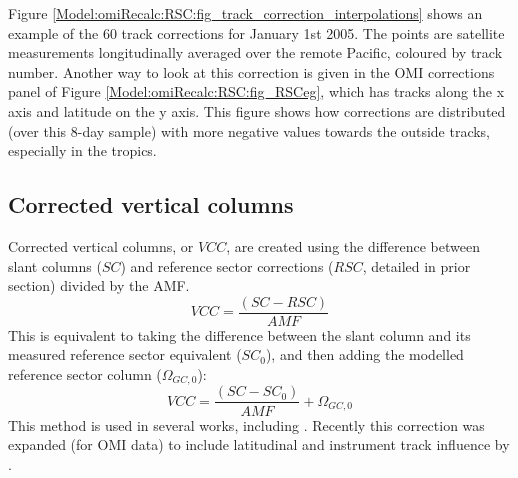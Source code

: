     Figure \ref{Model:omiRecalc:RSC:fig_track_correction_interpolations} shows an example of the 60 track corrections for January 1st 2005.
    The points are satellite measurements longitudinally averaged over the remote Pacific, coloured by track number.
    Another way to look at this correction is given in the OMI corrections panel of Figure \ref{Model:omiRecalc:RSC:fig_RSCeg}, which has tracks along the x axis and latitude on the y axis.
    This figure shows how corrections are distributed (over this 8-day sample) with more negative values towards the outside tracks, especially in the tropics.
    
    
  
  \subsection{Corrected vertical columns}
    \label{Model:omiRecalc:vcc}
    
    Corrected vertical columns, or $VCC$, are created using the difference between slant columns ($SC$) and reference sector corrections ($RSC$, detailed in prior section) divided by the AMF. 
    \begin{equation}
      \label{Model:omiRecalc:vcc:eqn_vcc}
      VCC = \frac{ \left( SC - RSC \right) }{ AMF }
    \end{equation}
    This is equivalent to taking the difference between the slant column and its measured reference sector equivalent ($SC_0$), and then adding the modelled reference sector column ($\Omega_{GC,0}$):
    \begin{equation}
      \label{Model:omiRecalc:vcc:eqn_vcc_equiv}
      VCC = \frac{ \left( SC - SC_0 \right) }{ AMF } + \Omega_{GC,0}
    \end{equation}
    This method is used in several works, including \textcite[][]{DeSmedt2008, DeSmedt2012, DeSmedt2015, Barkley2013, Bauwens2016}.
    Recently this correction was expanded (for OMI data) to include latitudinal and instrument track influence by \textcite{Abad2015}.
    
